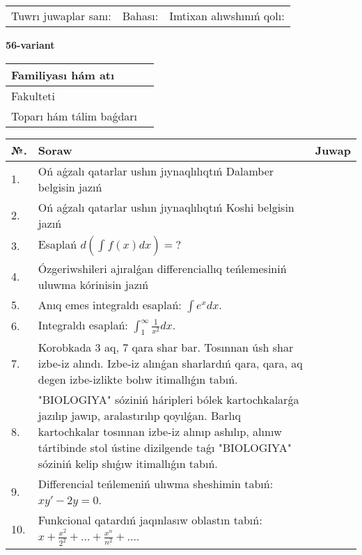 \documentclass{article}
\begin{document}
\vspace{1cm}

\begin{tabular}{ c c c }
Tuwrı juwaplar sanı: \underline{\hspace{2cm}} & Bahası: \underline{\hspace{2cm}} & Imtixan alıwshınıń qolı: \underline{\hspace{2cm}} \\
\end{tabular}

\newpage

\begin{center}\textbf{56-variant}\end{center}

\bgroup
\def\arraystretch{1.5}
\begin{tabular}{ |m{6cm}|m{10cm}| }
  \hline
  Familiyası hám atı & \\
  \hline
  Fakulteti &\\
  \hline
  Toparı hám tálim baǵdarı & \\
  \hline
\end{tabular}
\egroup

\vspace{0.5cm}

\bgroup
\def\arraystretch{2}
\begin{tabular}{ |l|m{8cm}|m{7cm}| }
  \hline
  №. & Soraw & Juwap \\
  \hline
  1. & Oń aǵzalı qatarlar ushın jıynaqlılıqtıń Dalamber belgisin jazıń &  \\
  \hline
  2. & Oń aǵzalı qatarlar ushın jıynaqlılıqtıń Koshi belgisin jazıń &  \\
  \hline
  3. & Esaplań $\displaystyle d\left( \int_{}^{}{f(x)dx} \right) = ?$ &  \\
  \hline
  4. & Ózgeriwshileri ajıralǵan differenciallıq teńlemesiniń uluwma kórinisin jazıń &  \\
  \hline
  5. & Anıq emes integraldı esaplań: $\displaystyle\int e^{x}dx$. &  \\
  \hline
  6. & Integraldı esaplań: $\displaystyle\int_{1}^{\infty}{\frac{1}{x^{2}}dx}$. &  \\
  \hline
  7. & Korobkada 3 aq, 7 qara shar bar. Tosınnan úsh shar izbe-iz alındı. Izbe-iz alınǵan sharlardıń qara, qara, aq degen izbe-izlikte bolıw itimallıǵın tabıń. &  \\
  \hline
  8. & "BIOLOGIYA" sóziniń háripleri bólek kartochkalarǵa jazılıp jawıp, aralastırılıp qoyılǵan. Barlıq kartochkalar tosınnan izbe-iz alınıp ashılıp, alınıw tártibinde stol ústine dizilgende taǵı "BIOLOGIYA" sóziniń kelip shıǵıw itimallıǵın tabıń. &  \\
  \hline
  9. & Differencial teńlemeniń ulıwma sheshimin tabıń: $xy' - 2y = 0$. &  \\
  \hline
  10. & Funkcional qatardıń jaqınlasıw oblastın tabıń: $\displaystyle x + \frac{x^{2}}{2^{2}} + \ldots + \frac{x^{n}}{n^{2}} + \ldots$. &  \\
  \hline
\end{tabular}
\egroup
\end{document}
